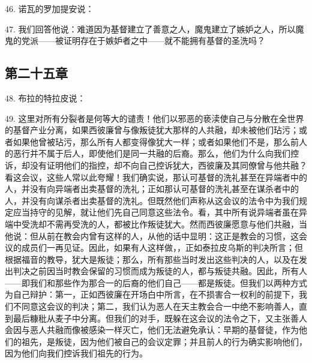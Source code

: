 46. 诺瓦的罗加提安说：\par

47. 我们回答他说：难道因为基督建立了善意之人，魔鬼建立了嫉妒之人，所以魔鬼的党派——被证明存在于嫉妒者之中——就不能拥有基督的圣洗吗？\par


\subsection{第二十五章}

48. 布拉的特拉皮说：\par

49. 这里对所有分裂者是何等大的谴责！他们以邪恶的亵渎使自己与分散在全世界的基督产业分离，如果西彼廉曾与像叛徒犹大那样的人共融，却未被他们玷污；或者如果他曾被玷污，那么所有人都变得像犹大一样；或者如果他们不是，那么前人的恶行并不属于后人，即使他们是同一共融的后裔。那么，他们为什么向我们控诉，却没有证明他们的指控，却不向自己控诉犹大，西彼廉及其同僚曾与他共融？看这会议，这些人常以此夸耀！我们确实说，那认可基督的洗礼甚至在异端者中的人，并没有向异端者出卖基督的洗礼；正如那认可基督的洗礼甚至在谋杀者中的人，并没有向谋杀者出卖基督的洗礼。但既然他们声称从这会议的法令中为我们规定应当持守的见解，就让他们先自己同意这些法令。看，其中所有说异端者虽在异端中受洗却不需再受洗的人，都被比作叛徒犹大。然而西彼廉愿意与他们共融，当他说：但从前在教会内曾有这样的人，从他的话中显明：这正是教会的习惯，这会议的成员们一再见证。因此，如果有人这样做，，正如泰拉皮乌斯的判决所言；但根据福音的教导，犹大是叛徒；那么，所有那些当时发出这些判决的人，以及在发出判决之前因当时教会保留的习惯而成为叛徒的人，都与叛徒共融。因此，所有人——即我们和那些作为那合一的后裔的他们自己——都是叛徒。但我们以两种方式为自己辩护：第一，正如西彼廉在开场白中所言，在不损害合一权利的前提下，我们不同意这会议的判决；第二，我们认为恶人在天主教会合一中绝不影响善人，直到最后糠秕从麦子中分离。但我们的对手，既躲在这会议的法令之下，又主张善人会因与恶人共融而像被感染一样灭亡，他们无法避免承认：早期的基督徒，作为他们的祖先，是叛徒，因为他们被自己的会议定罪；并且前人的行为确实影响他们，因为他们向我们控诉我们祖先的行为。\par

